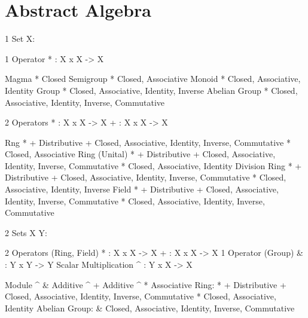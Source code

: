 \part{Abstract Algebra}\label{part:abstract_algebra}

\iffalse

1 Set X:

  1 Operator
  * : X x X -> X

    Magma         * Closed
    Semigroup     * Closed, Associative
    Monoid        * Closed, Associative, Identity
    Group         * Closed, Associative, Identity, Inverse
    Abelian Group * Closed, Associative, Identity, Inverse, Commutative

  2 Operators
  * : X x X -> X
  + : X x X -> X

    Rng           * + Distributive
                    + Closed, Associative, Identity, Inverse, Commutative
                    * Closed, Associative
    Ring (Unital) * + Distributive
                    + Closed, Associative, Identity, Inverse, Commutative
                    * Closed, Associative, Identity
    Division Ring * + Distributive
                    + Closed, Associative, Identity, Inverse, Commutative
                    * Closed, Associative, Identity, Inverse
    Field         * + Distributive
                    + Closed, Associative, Identity, Inverse, Commutative
                    * Closed, Associative, Identity, Inverse, Commutative

2 Sets X Y:

  2 Operators (Ring, Field)
  * : X x X -> X
  + : X x X -> X
  1 Operator (Group)
  & : Y x Y -> Y
  Scalar Multiplication
  ^ : Y x X -> X

    Module
                    ^ & Additive
                    ^ + Additive
                    ^ * Associative
              Ring: * + Distributive
                      + Closed, Associative, Identity, Inverse, Commutative
                      * Closed, Associative, Identity
            Abelian
             Group:   & Closed, Associative, Identity, Inverse, Commutative


